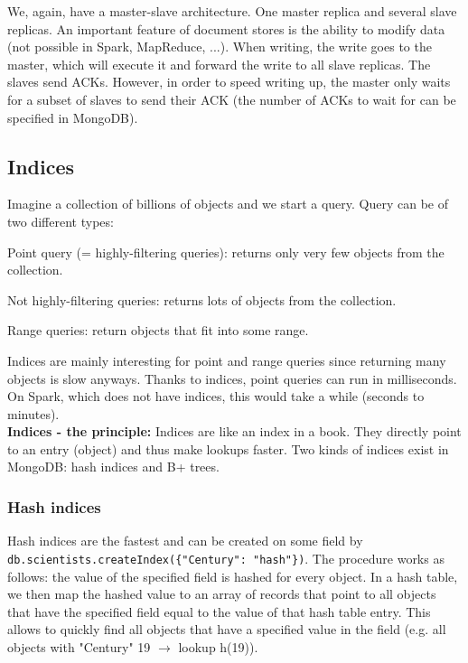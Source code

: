 \documentclass[11pt,oneside,a4paper]{article}
\begin{document}
We, again, have a master-slave architecture. One master replica and several slave replicas. An important feature of document stores is the ability to modify data (not possible in Spark, MapReduce, ...). When writing, the write goes to the master, which will execute it and forward the write to all slave replicas. The slaves send ACKs. However, in order to speed writing up, the master only waits for a subset of slaves to send their ACK (the number of ACKs to wait for can be specified in MongoDB).

\subsection{Indices}

Imagine a collection of billions of objects and we start a query. Query can be of two different types:

\begin{compactitem}
\item Point query (= highly-filtering queries): returns only very few objects from the collection.
\item Not highly-filtering queries: returns lots of objects from the collection.
\item Range queries: return objects that fit into some range.
\end{compactitem}

Indices are mainly interesting for point and range queries since returning many objects is slow anyways. Thanks to indices, point queries can run in milliseconds. On Spark, which does not have indices, this would take a while (seconds to minutes).\\ 

\textbf{Indices - the principle:} Indices are like an index in a book. They directly point to an entry (object) and thus make lookups faster. Two kinds of indices exist in MongoDB: hash indices and B+ trees.


\subsubsection{Hash indices}

Hash indices are the fastest and can be created on some field by \texttt{db.scientists.createIndex(\{"Century": "hash"\})}. The procedure works as follows: the value of the specified field is hashed for every object. In a hash table, we then map the hashed value to an array of records that point to all objects that have the specified field equal to the value of that hash table entry. This allows to quickly find all objects that have a specified value in the field (e.g. all objects with "Century" 19 $\rightarrow$ lookup h(19)).
\end{document}
